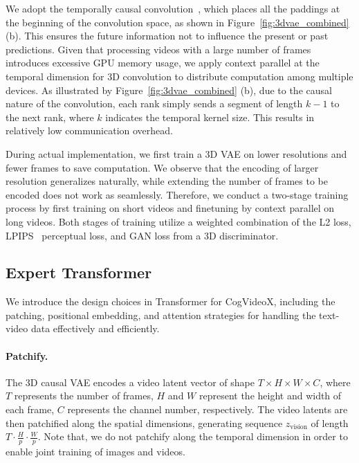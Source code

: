 \documentclass{article} \usepackage{iclr2024_conference,times}
\newcommand{\model}{CogVideoX\xspace}
\begin{document}
We adopt the temporally causal convolution~\cite{yu2023language}, which places all the paddings at the beginning of the convolution space, as shown in Figure~\ref{fig:3dvae_combined} (b). 
This ensures the future information not to influence the present or past predictions. 
Given that processing videos with a large number of frames introduces excessive GPU memory usage, we apply context parallel at the temporal dimension for 3D convolution to distribute computation among multiple devices. 
As illustrated by Figure~\ref{fig:3dvae_combined} (b), due to the causal nature of the convolution, each rank simply sends a segment of length $k-1$ to the next rank, where $k$ indicates the temporal kernel size. 
This results in relatively low communication overhead.

During actual implementation, we first train a 3D VAE on lower resolutions and fewer frames to save computation. 
We observe that the encoding of larger resolution generalizes naturally, while extending the number of frames to be encoded does not work as seamlessly. 
Therefore, we conduct a two-stage training process by first training on short videos and finetuning by context parallel on long videos. 
Both stages of training utilize a weighted combination of the L2 loss, LPIPS~\cite{zhang2018unreasonable} perceptual loss, and GAN loss from a 3D discriminator.
 
\subsection{Expert Transformer}\label{sec:expert-transformer}

We introduce the design choices in Transformer for \model, including the patching, positional embedding, and attention strategies for handling the text-video data effectively and efficiently. 

\paragraph{Patchify.}
The 3D causal VAE encodes a video latent vector of shape $T \times H \times W \times C$, where $T$ represents the number of frames, $H$ and $W$ represent the height and width of each frame, $C$ represents the channel number, respectively.
The video latents are then patchified  along the spatial dimensions, generating sequence $z_{\text{vision}}$ of length $T\cdot \frac{H}{p} \cdot \frac{W}{p}$. 
Note that, we do not patchify along the temporal dimension in order to enable joint training of images and videos.
\end{document}
